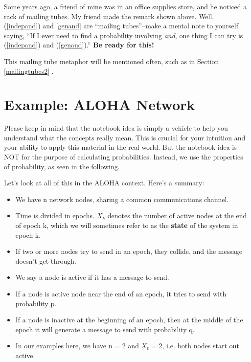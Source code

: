Some years ago, a friend of mine was in an office supplies store, and he
noticed a rack of mailing tubes.  My friend made the remark shown above.
Well, (\ref{indepand}) and \ref{genand} are ``mailing tubes''--make a
mental note to yourself saying, ``If I ever need to find a probability
involving {\it and}, one thing I can try is (\ref{indepand}) and
(\ref{genand}).''  {\bf \LARGE Be ready for this!}

This mailing tube metaphor will be mentioned often, such as in Section
\ref{mailingtubes2} .

\section{Example:  ALOHA Network}
\label{basicprobcomp}

Please keep in mind that the notebook idea is simply a vehicle to
help you understand what the concepts really mean.  This is crucial for
your intuition and your ability to apply this material in the real
world.    But the notebook idea is NOT for the purpose of calculating
probabilities.  Instead, we use the properties of probability, as seen
in the following. 

Let's look at all of this in the ALOHA context.  Here's a summary:

\begin{itemize}

\item We have n network nodes, sharing a common communications channel.

\item Time is divided in epochs.  $X_k$ denotes the number of active nodes at
the end of epoch k, which we will sometimes refer to as the {\bf state}
of the system in epoch k.

\item If two or more nodes try to send in an epoch, they collide, and
the message doesn't get through.

\item We say a node is active if it has a message to send.

\item If a node is active node near the end of an epoch, it tries to
send with probability p.  

\item If a node is inactive at the beginning of an epoch, then at the
middle of the epoch it will generate a message to send with probability
q.

\item In our examples here, we have n = 2 and $X_0 = 2$, i.e. both nodes
start out active.

\end{itemize}

